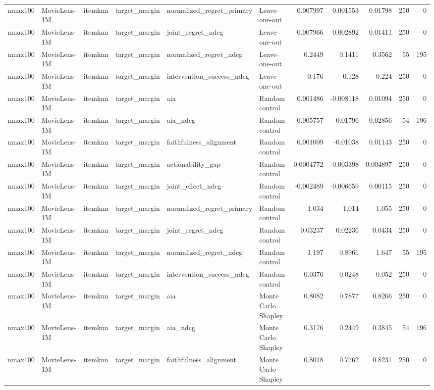 \begin{table}[t]
{\begin{tabular}{llllllrrrrr}
nmax100 & MovieLens-1M & itemknn & target\_margin & normalized\_regret\_primary & Leave-one-out & 0.007997 & 0.001553 & 0.01798 & 250 & 0 \\
nmax100 & MovieLens-1M & itemknn & target\_margin & joint\_regret\_ndcg & Leave-one-out & 0.007966 & 0.002892 & 0.01411 & 250 & 0 \\
nmax100 & MovieLens-1M & itemknn & target\_margin & normalized\_regret\_ndcg & Leave-one-out & 0.2449 & 0.1411 & 0.3562 & 55 & 195 \\
nmax100 & MovieLens-1M & itemknn & target\_margin & intervention\_success\_ndcg & Leave-one-out & 0.176 & 0.128 & 0.224 & 250 & 0 \\
nmax100 & MovieLens-1M & itemknn & target\_margin & aia & Random control & 0.001486 & -0.008118 & 0.01094 & 250 & 0 \\
nmax100 & MovieLens-1M & itemknn & target\_margin & aia\_ndcg & Random control & 0.005757 & -0.01796 & 0.02856 & 54 & 196 \\
nmax100 & MovieLens-1M & itemknn & target\_margin & faithfulness\_alignment & Random control & 0.001009 & -0.01038 & 0.01143 & 250 & 0 \\
nmax100 & MovieLens-1M & itemknn & target\_margin & actionability\_gap & Random control & 0.0004772 & -0.003398 & 0.004897 & 250 & 0 \\
nmax100 & MovieLens-1M & itemknn & target\_margin & joint\_effect\_ndcg & Random control & -0.002489 & -0.006659 & 0.00115 & 250 & 0 \\
nmax100 & MovieLens-1M & itemknn & target\_margin & normalized\_regret\_primary & Random control & 1.034 & 1.014 & 1.055 & 250 & 0 \\
nmax100 & MovieLens-1M & itemknn & target\_margin & joint\_regret\_ndcg & Random control & 0.03237 & 0.02236 & 0.0434 & 250 & 0 \\
nmax100 & MovieLens-1M & itemknn & target\_margin & normalized\_regret\_ndcg & Random control & 1.197 & 0.8961 & 1.647 & 55 & 195 \\
nmax100 & MovieLens-1M & itemknn & target\_margin & intervention\_success\_ndcg & Random control & 0.0376 & 0.0248 & 0.052 & 250 & 0 \\
nmax100 & MovieLens-1M & itemknn & target\_margin & aia & Monte Carlo Shapley & 0.8082 & 0.7877 & 0.8266 & 250 & 0 \\
nmax100 & MovieLens-1M & itemknn & target\_margin & aia\_ndcg & Monte Carlo Shapley & 0.3176 & 0.2449 & 0.3845 & 54 & 196 \\
nmax100 & MovieLens-1M & itemknn & target\_margin & faithfulness\_alignment & Monte Carlo Shapley & 0.8018 & 0.7762 & 0.8231 & 250 & 0 \\

\end{tabular}}
\end{table}
